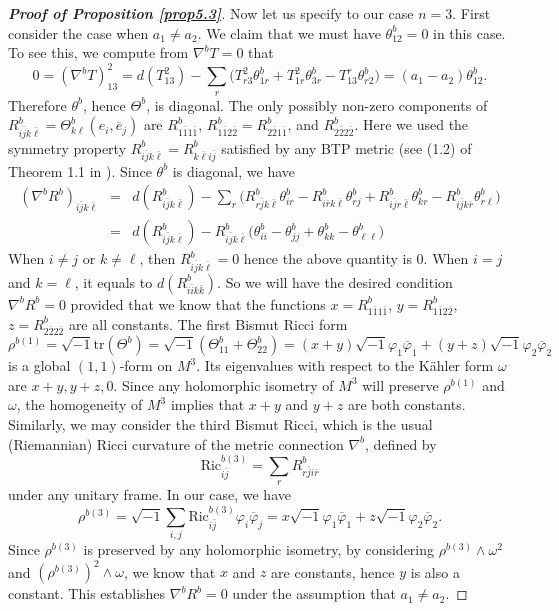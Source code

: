 \documentclass{amsart}
\numberwithin{equation}{section}
\theoremstyle{definition}
\renewcommand{\1}{\mathds{1}}
\renewcommand{\>}{\rightarrow}
\begin{document}
\begin{proof}[{\bf Proof of Proposition \ref{prop5.3}}]
Now let us specify to our case $n=3$. First consider the case when $a_1\neq a_2$. We claim that we must have $\theta^b_{12}=0$ in this case. To see this, we compute from $\nabla^bT=0$ that
$$ 0 = (\nabla^bT)^2_{13} = d (T^2_{13}) - \sum_r \big( T^2_{r3}\theta^b_{1r} +T^2_{1r}\theta^b_{3r} - T^r_{13}\theta^b_{r2} \big) = (a_1-a_2)\theta^b_{12}.$$
Therefore $\theta^b$, hence $\Theta^b$, is diagonal. The only possibly non-zero components of $R^b_{i\bar{j}k\bar{\ell}} = \Theta^b_{k\ell }(e_i, \overline{e}_j)$ are $R^b_{1\bar{1}1\bar{1}}$, $R^b_{1\bar{1}2\bar{2}}= R^b_{2\bar{2}1\bar{1}}$, and $R^b_{2\bar{2}2\bar{2}}$. Here we used the symmetry property $R^b_{i\bar{j}k\bar{\ell}} =R^b_{k\bar{\ell}i\bar{j}}$ satisfied by any {\rm BTP} metric (see (1.2) of Theorem 1.1 in \cite{ZhaoZ22}). Since $\theta^b$ is diagonal, we have
\begin{eqnarray*} (\nabla^bR^b)_{i\bar{j}k\bar{\ell}} & = &  d(R^b_{i\bar{j}k\bar{\ell}}) - \sum_r \big( R^b_{r\bar{j}k\bar{\ell}} \theta^b_{ir} - R^b_{i\bar{r}k\bar{\ell}} \theta^b_{rj} + R^b_{i\bar{j}r\bar{\ell}} \theta^b_{kr} - R^b_{i\bar{j}k\bar{r}} \theta^b_{r\ell } \big) \\
& = &  d(R^b_{i\bar{j}k\bar{\ell}}) - R^b_{i\bar{j}k\bar{\ell}} \big( \theta^b_{ii} -  \theta^b_{jj} + \theta^b_{kk} -  \theta^b_{\ell \ell } \big)
\end{eqnarray*}
When $i\neq j$ or $k\neq \ell$, then $R^b_{i\bar{j}k\bar{\ell}}=0$ hence the above quantity is $0$. When $i=j$  and $k=\ell$, it equals to $d(R^b_{i\bar{i}k\bar{k}})$. So we will have the desired condition $\nabla^bR^b=0$ provided that we know that the functions $x=R^b_{1\bar{1}1\bar{1}}$, $y=R^b_{1\bar{1}2\bar{2}}$, $z=R^b_{2\bar{2}2\bar{2}}$ are all constants. The first Bismut Ricci form
$$ \rho^{b(1)}= \sqrt{-1} \mbox{tr}(\Theta^b) = \sqrt{-1} (\Theta^b_{11} + \Theta^b_{22}) = (x+y)\sqrt{-1} \varphi_1\overline{\varphi}_1 + (y+z) \sqrt{-1}\varphi_2\overline{\varphi}_2 $$
is a global $(1,1)$-form on $M^3$. Its eigenvalues with respect to the K\"ahler form $\omega$ are $x+y, y+z, 0$. Since any holomorphic isometry of $M^3$ will preserve $\rho^{b(1)}$ and $\omega$, the homogeneity of $M^3$ implies that $x+y$ and $y+z$ are both constants. Similarly, we may consider the third Bismut Ricci, which is the usual (Riemannian) Ricci curvature of the  metric connection $\nabla^b$, defined by
$$ \mbox{Ric}^{b(3)}_{i\bar{j}} = \sum_r R^b_{ r\bar{j} i\bar{r} } $$
under any unitary frame. In our case, we have
$$ \rho^{b(3)}= \sqrt{-1} \sum_{i,j} \mbox{Ric}^{b(3)}_{i\bar{j}} \varphi_i \overline{\varphi}_j = x\sqrt{-1} \varphi_1\overline{\varphi}_1 + z\sqrt{-1}\varphi_2\overline{\varphi}_2 .$$
Since $\rho^{b(3)}$ is preserved by any holomorphic isometry, by considering $ \rho^{b(3)}\wedge \omega^2 $ and $(\rho^{b(3)} )^2\wedge \omega $, we know that $x$ and $z$ are constants, hence $y$ is also a constant. This establishes $\nabla^bR^b=0$ under the assumption that $a_1\neq a_2$.


\end{proof}
\end{document}
